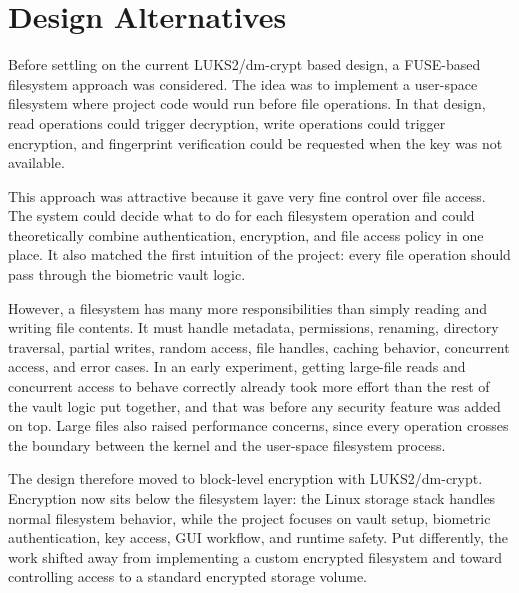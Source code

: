 \section{Design Alternatives}

Before settling on the current LUKS2/dm-crypt based design, a FUSE-based filesystem approach was considered. The idea was to implement a user-space filesystem where project code would run before file operations. In that design, read operations could trigger decryption, write operations could trigger encryption, and fingerprint verification could be requested when the key was not available.

This approach was attractive because it gave very fine control over file access. The system could decide what to do for each filesystem operation and could theoretically combine authentication, encryption, and file access policy in one place. It also matched the first intuition of the project: every file operation should pass through the biometric vault logic.

However, a filesystem has many more responsibilities than simply reading and writing file contents. It must handle metadata, permissions, renaming, directory traversal, partial writes, random access, file handles, caching behavior, concurrent access, and error cases. In an early experiment, getting large-file reads and concurrent access to behave correctly already took more effort than the rest of the vault logic put together, and that was before any security feature was added on top. Large files also raised performance concerns, since every operation crosses the boundary between the kernel and the user-space filesystem process.

The design therefore moved to block-level encryption with LUKS2/dm-crypt. Encryption now sits below the filesystem layer: the Linux storage stack handles normal filesystem behavior, while the project focuses on vault setup, biometric authentication, key access, GUI workflow, and runtime safety. Put differently, the work shifted away from implementing a custom encrypted filesystem and toward controlling access to a standard encrypted storage volume.

